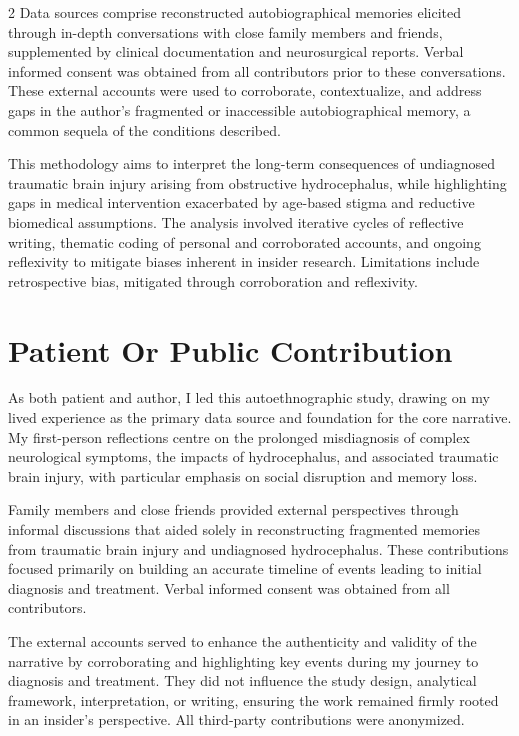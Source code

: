 \documentclass{article}
\begin{document}
\begin{multicols}{2}
Data sources comprise reconstructed autobiographical memories elicited through in-depth conversations with close family members and friends, supplemented by clinical documentation and neurosurgical reports. Verbal informed consent was obtained from all contributors prior to these conversations. These external accounts were used to corroborate, contextualize, and address gaps in the author's fragmented or inaccessible autobiographical memory, a common sequela of the conditions described. 

This methodology aims to interpret the long-term consequences of undiagnosed traumatic brain injury arising from obstructive hydrocephalus, while highlighting gaps in medical intervention exacerbated by age-based stigma and reductive biomedical assumptions. The analysis involved iterative cycles of reflective writing, thematic coding of personal and corroborated accounts, and ongoing reflexivity to mitigate biases inherent in insider research. Limitations include retrospective bias, mitigated through corroboration and reflexivity.

\section*{Patient Or Public Contribution}
As both patient and author, I led this autoethnographic study, drawing on my lived experience as the primary data source and foundation for the core narrative. My first-person reflections centre on the prolonged misdiagnosis of complex neurological symptoms, the impacts of hydrocephalus, and associated traumatic brain injury, with particular emphasis on social disruption and memory loss.

Family members and close friends provided external perspectives through informal discussions that aided solely in reconstructing fragmented memories from traumatic brain injury and undiagnosed hydrocephalus. These contributions focused primarily on building an accurate timeline of events leading to initial diagnosis and treatment. Verbal informed consent was obtained from all contributors.

The external accounts served to enhance the authenticity and validity of the narrative by corroborating and highlighting key events during my journey to diagnosis and treatment. They did not influence the study design, analytical framework, interpretation, or writing, ensuring the work remained firmly rooted in an insider’s perspective. All third-party contributions were anonymized.


\end{multicols}
\end{document}
